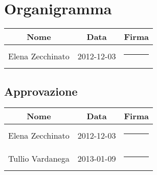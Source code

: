 

\setcounter{page}{1}
\pagestyle{normal}

\section{Organigramma}
\begin{center}
\begin{tabularx}{0.8\textwidth}{c|c|c}
{\bf Nome}&{\bf Data}&{\bf Firma}\\ 
\hline
\multirow{2}{*}{Elena Zecchinato} &\multirow{2}{*}{ 2012-12-03} &\rule{3cm}{0cm} \\&&\\
\end{tabularx}
\end{center}

\subsection{Approvazione}
\begin{center}
\begin{tabularx}{0.8\textwidth}{c|c|c}
{\bf Nome}&{\bf Data}&{\bf Firma}\\ 
\hline
\multirow{2}{*}{Elena Zecchinato} & \multirow{2}{*}{2012-12-03} &\rule{3cm}{0cm} \\&&\\
\multirow{2}{*}{Tullio Vardanega} & \multirow{2}{*}{2013-01-09} &\rule{3cm}{0cm} \\&&\\
\end{tabularx}
\end{center}

